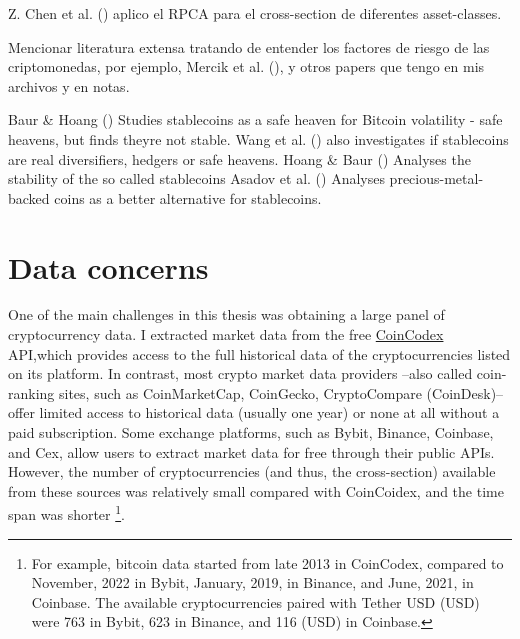 \documentclass[
  12pt,
  a4paper,
  openany]{scrbook}
\begin{document}
Z. Chen et al. () aplico el RPCA
para el cross-section de diferentes asset-classes.

Mencionar literatura extensa tratando de entender los factores de riesgo
de las criptomonedas, por ejemplo, Mercik et al.
(),
y otros papers que tengo en mis archivos y en notas.

Baur \& Hoang () Studies
stablecoins as a safe heaven for Bitcoin volatility - safe heavens, but
finds theyre not stable. Wang et al.
() also investigates if
stablecoins are real diversifiers, hedgers or safe heavens. Hoang \&
Baur () Analyses the stability of
the so called stablecoins Asadov et al.
() Analyses
precious-metal-backed coins as a better alternative for stablecoins.

\section{Data concerns}\label{data-concerns}

One of the main challenges in this thesis was obtaining a large panel of
cryptocurrency data. I extracted market data from the free
\href{https://coincodex.com/}{CoinCodex} API,which provides access to
the full historical data of the cryptocurrencies listed on its platform.
In contrast, most crypto market data providers --also called
coin-ranking sites, such as CoinMarketCap, CoinGecko, CryptoCompare
(CoinDesk)-- offer limited access to historical data (usually one year)
or none at all without a paid subscription. Some exchange platforms,
such as Bybit, Binance, Coinbase, and Cex, allow users to extract market
data for free through their public APIs. However, the number of
cryptocurrencies (and thus, the cross-section) available from these
sources was relatively small compared with CoinCoidex, and the time span
was shorter \footnote{For example, bitcoin data started from late 2013
  in CoinCodex, compared to November, 2022 in Bybit, January, 2019, in
  Binance, and June, 2021, in Coinbase. The available cryptocurrencies
  paired with Tether USD (USD) were 763 in Bybit, 623 in Binance, and
  116 (USD) in Coinbase.}.
\end{document}
